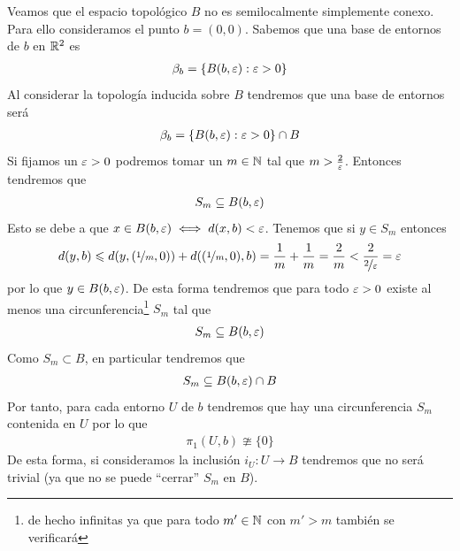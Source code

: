 \begin{ejemplo}
\begin{enumerate}
        Veamos que el espacio topológico $B$ no es semilocalmente simplemente conexo. Para ello consideramos el punto $b=(0,0)$. Sabemos que una base de entornos de $b$ en $\mathbb{R}^2$ es 
        \begin{gather*}
            \beta_b = \{B(b,\varepsilon) : \varepsilon > 0\}
        \end{gather*}
        Al considerar la topología inducida sobre $B$ tendremos que una base de entornos será 
        \begin{gather*}
            \beta_b = \{B(b,\varepsilon) : \varepsilon > 0\}\cap B
        \end{gather*}
        Si fijamos un $\varepsilon > 0$ podremos tomar un $m\in \mathbb{N}$ tal que $m>\frac{2}{\varepsilon}$. Entonces tendremos que 
        \begin{gather*}
            S_m \subseteq B(b,\varepsilon)
        \end{gather*}
        Esto se debe a que $x\in B(b,\varepsilon) \iff d(x,b) < \varepsilon$. Tenemos que si $y\in S_m$ entonces
        \begin{gather*}
            d(y,b) \leqslant d(y, (\nicefrac{1}{m}, 0)) + d((\nicefrac{1}{m}, 0), b) = \frac{1}{m} + \frac{1}{m} = \frac{2}{m} < \frac{2}{\nicefrac{2}{\varepsilon}} = \varepsilon
        \end{gather*}
        por lo que $y\in B(b,\varepsilon)$. De esta forma tendremos que para todo $\varepsilon>0$ existe al menos una circunferencia\footnote{de hecho infinitas ya que para todo $m'\in \mathbb{N}$ con $m'>m$ también se verificará} $S_m$ tal que 
        \begin{gather*}
            S_m \subseteq B(b,\varepsilon)
        \end{gather*}
        Como $S_m\subset B$, en particular tendremos que 
        \begin{gather*}
            S_m \subseteq B(b,\varepsilon) \cap B
        \end{gather*}
        Por tanto, para cada entorno $U$ de $b$ tendremos que hay una circunferencia $S_m$ contenida en $U$ por lo que
        \begin{gather*}
            \pi_1(U,b) \ncong \{0\}
        \end{gather*}
        De esta forma, si consideramos la inclusión $i_U:U \to B$ tendremos que no será trivial (ya que no se puede ``cerrar'' $S_m$ en $B$).


\end{enumerate}
\end{ejemplo}
